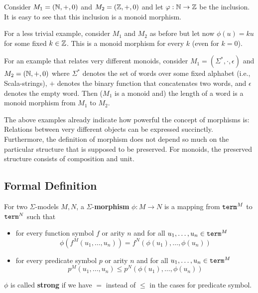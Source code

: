 \begin{example}
Consider $M_1=(\mathbb{N},+,0)$ and $M_2=(\mathbb{Z},+,0)$ and let $\varphi:\mathbb{N}\rightarrow\mathbb{Z}$ be the inclusion.
It is easy to see that this inclusion is a monoid morphism.

For a less trivial example, consider $M_1$ and $M_2$ as before but let now $\phi(u)=k u$ for some fixed $k\in\mathbb{Z}$.
This is a monoid morphism for every $k$ (even for $k=0$).

For an example that relates very different monoids, consider $M_1=(\Sigma^*,\cdot,\epsilon)$ and $M_2=(\mathbb{N},+,0)$ where $\Sigma^*$ denotes the set of words over some fixed alphabet (i.e., Scala-strings), $+$ denotes the binary function that concatenates two words, and $\epsilon$ denotes the empty word. Then ($M_1$ is a monoid and) the length of a word is a monoid morphism from $M_1$ to $M_2$.
\end{example}

The above examples already indicate how powerful the concept of morphisms is: Relations between very different objects can be expressed succinctly.
Furthermore, the definition of morphism does not depend so much on the particular structure that is supposed to be preserved.
For monoids, the preserved structure consists of composition and unit.

\subsection{Formal Definition}

\begin{definition}
For two $\Sigma$-models $M,N$, a $\Sigma$-\textbf{morphism} $\phi:M\to N$ is a mapping from $\mathtt{term}^M$ to $\mathtt{term}^N$ such that
\begin{itemize}
  \item for every function symbol $f$ or arity $n$ and for all $u_1,\ldots,u_n\in\mathtt{term}^M$
      \[\phi(f^M(u_1,\ldots,u_n))=f^N(\phi(u_1),\ldots,\phi(u_n))\]
  \item for every predicate symbol $p$ or arity $n$ and for all $u_1,\ldots,u_n\in\mathtt{term}^M$
      \[p^M(u_1,\ldots,u_n)\leq p^N(\phi(u_1),\ldots,\phi(u_n))\]
\end{itemize}
$\phi$ is called \textbf{strong} if we have $=$ instead of $\leq$ in the cases for predicate symbol.
\end{definition}

